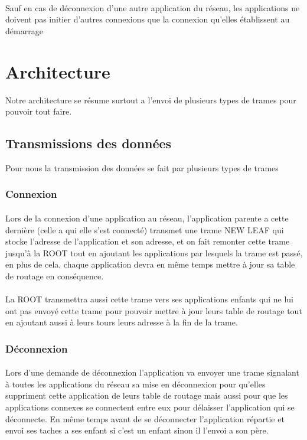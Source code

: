 \documentclass[a4paper,titlepage]{report}
\begin{document}
\paragraph{}
Sauf en cas de déconnexion d'une autre application du réseau, les applications ne doivent pas initier d'autres connexions que la connexion qu'elles établissent au démarrage
\pagebreak







\section{Architecture}
Notre architecture se résume surtout a l'envoi de plusieurs types de trames pour pouvoir tout faire.
\subsection{Transmissions des données}
Pour nous la transmission des données se fait par plusieurs types de trames 
\subsubsection{Connexion}
\paragraph{}
Lors de la connexion d'une application au réseau, l'application parente a cette dernière (celle a qui elle s'est connecté) transmet une trame NEW LEAF qui stocke l'adresse de l'application et son adresse, et on fait remonter cette trame jusqu'à la ROOT tout en ajoutant les applications par lesquels la trame est passé, en plus de cela, chaque application devra en même temps mettre à jour sa table de routage en conséquence. 
\paragraph{}
La ROOT transmettra aussi cette trame vers ses applications enfants qui ne lui ont pas envoyé cette trame pour pouvoir mettre à jour leurs table de routage tout en ajoutant aussi à leurs tours leurs adresse à la fin de la trame.

\subsubsection{Déconnexion}
\paragraph{}
Lors d'une demande de déconnexion l'application va envoyer une trame signalant à toutes les applications du réseau sa mise en déconnexion pour qu'elles suppriment cette application de leurs table de routage mais aussi pour que les applications connexes se connectent entre eux pour délaisser l'application qui se déconnecte. En même temps avant de se déconnecter l'application répartie et envoi ses taches a ses enfant si c'est un enfant sinon il l'envoi a son père.
\end{document}
